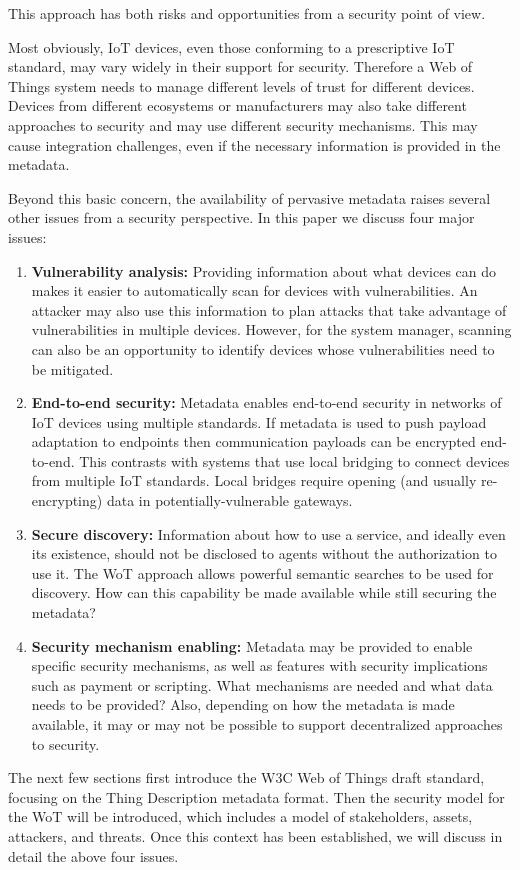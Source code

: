 This approach has both risks and opportunities from a security point of view.

Most obviously, IoT devices, even those conforming to a prescriptive IoT standard,
may vary widely in their support for security.
Therefore a Web of Things system
needs to manage different levels of trust for different devices.
Devices from different ecosystems or manufacturers may also take different approaches to
security and may use different security mechanisms. 
This may cause integration challenges, even if the necessary
information is provided in the metadata.

Beyond this basic concern,
the availability of pervasive metadata raises several other issues
from a security perspective.
In this paper we discuss four major issues:
\begin{enumerate}
\item \textbf{Vulnerability analysis:}
Providing information about what devices can do makes it easier to 
automatically scan for devices with vulnerabilities.
An attacker may also use this information to plan attacks that take advantage of 
vulnerabilities in multiple devices. 
However, for the system manager, scanning can also be an opportunity 
to identify devices whose vulnerabilities need to be mitigated.
\item \textbf{End-to-end security:}
Metadata enables end-to-end security in networks of IoT devices using multiple standards.
If metadata is used to push payload adaptation to endpoints then 
communication payloads can be encrypted end-to-end.  
This contrasts with systems that use local bridging to connect devices from multiple IoT standards.
Local bridges require opening (and usually re-encrypting) data in potentially-vulnerable gateways.
\item \textbf{Secure discovery:}
Information about how to use a service, 
and ideally even its existence, should not
be disclosed to agents without the authorization to use it.
The WoT approach allows powerful semantic searches to be used for discovery.
How can this capability be made available while still securing the metadata?
\item \textbf{Security mechanism enabling:}
Metadata may be provided to enable specific security mechanisms,
as well as features with security implications such as payment or scripting.
What mechanisms are needed and what data needs to be provided?
Also, depending on how the metadata is made available, it may or may not be 
possible to support decentralized approaches to security.
\end{enumerate}

The next few sections first introduce the W3C Web of Things draft standard,
focusing on the Thing Description metadata format.  
Then the security model for the WoT will be introduced,
which includes a model of stakeholders, assets, attackers, and threats.
Once this context has been established, we will discuss in detail the above
four issues.


